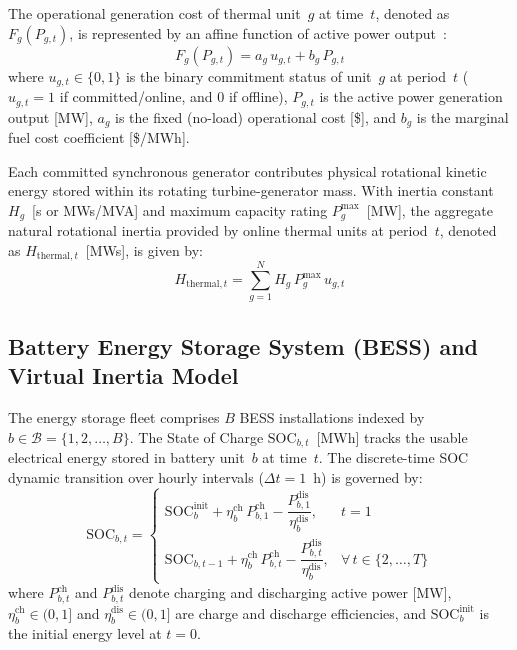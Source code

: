 \documentclass[journal]{IEEEtran}
\begin{document}
The operational generation cost of thermal unit~$g$ at time~$t$, denoted as $F_g(P_{g,t})$, is represented by an affine function of active power output~\cite{E02Sulawesi}:
\begin{equation}
  F_g(P_{g,t}) = a_g\,u_{g,t} + b_g\,P_{g,t}
  \label{eq:thermal_cost}
\end{equation}
where $u_{g,t} \in \{0, 1\}$ is the binary commitment status of unit~$g$ at period~$t$ ($u_{g,t}=1$ if committed/online, and $0$ if offline), $P_{g,t}$ is the active power generation output [MW], $a_g$ is the fixed (no-load) operational cost [\$], and $b_g$ is the marginal fuel cost coefficient [\$/MWh].

Each committed synchronous generator contributes physical rotational kinetic energy stored within its rotating turbine-generator mass. With inertia constant $H_g$~[s or MWs/MVA] and maximum capacity rating $P_g^{\max}$~[MW], the aggregate natural rotational inertia provided by online thermal units at period~$t$, denoted as $H_{\text{thermal},t}$~[MWs], is given by:
\begin{equation}
  H_{\text{thermal},t} = \sum_{g=1}^{N} H_g\,P_g^{\max}\,u_{g,t}
  \label{eq:thermal_inertia}
\end{equation}

\subsection{Battery Energy Storage System (BESS) and Virtual Inertia Model}

The energy storage fleet comprises $B$ BESS installations indexed by $b \in \mathcal{B} = \{1, 2, \dots, B\}$. The State of Charge $\text{SOC}_{b,t}$~[MWh] tracks the usable electrical energy stored in battery unit~$b$ at time~$t$. The discrete-time SOC dynamic transition over hourly intervals ($\Delta t = 1$~h) is governed by:
\begin{equation}
  \text{SOC}_{b,t} = 
  \begin{cases}
    \text{SOC}_b^{\text{init}} + \eta_b^{\text{ch}}\,P_{b,1}^{\text{ch}} - \dfrac{P_{b,1}^{\text{dis}}}{\eta_b^{\text{dis}}}, & t = 1 \\[10pt]
    \text{SOC}_{b,t-1} + \eta_b^{\text{ch}}\,P_{b,t}^{\text{ch}} - \dfrac{P_{b,t}^{\text{dis}}}{\eta_b^{\text{dis}}}, & \forall\,t \in \{2, \dots, T\}
  \end{cases}
  \label{eq:soc_dynamics}
\end{equation}
where $P_{b,t}^{\text{ch}}$ and $P_{b,t}^{\text{dis}}$ denote charging and discharging active power [MW], $\eta_b^{\text{ch}} \in (0, 1]$ and $\eta_b^{\text{dis}} \in (0, 1]$ are charge and discharge efficiencies, and $\text{SOC}_b^{\text{init}}$ is the initial energy level at $t=0$.
\end{document}

